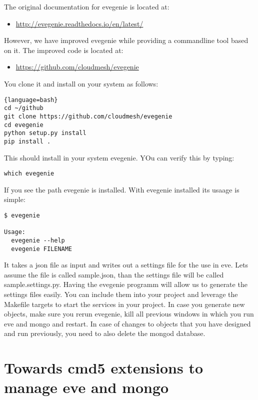 The original documentation for evegenie is located at:

\begin{itemize}
\item
 \url{http://evegenie.readthedocs.io/en/latest/}
\end{itemize}

However, we have improved evegenie while providing a commandline tool
based on it. The improved code is located at:

\begin{itemize}
\tightlist
\item
 \url{https://github.com/cloudmesh/evegenie}
\end{itemize}

You clone it and install on your system as follows:

\begin{lstlisting}{language=bash}
cd ~/github
git clone https://github.com/cloudmesh/evegenie
cd evegenie
python setup.py install
pip install .
\end{lstlisting}

This should install in your system evegenie. YOu can verify this by
typing:

\begin{lstlisting}
which evegenie
\end{lstlisting}

If you see the path evegenie is installed. With evegenie installed its
usaage is simple:

\begin{lstlisting}
$ evegenie

Usage:
  evegenie --help
  evegenie FILENAME
\end{lstlisting}

It takes a json file as input and writes out a settings file for the use
in eve. Lets assume the file is called sample.json, than the settings
file will be called sample.settings.py. Having the evegenie programm
will allow us to generate the settings files easily. You can include
them into your project and leverage the Makefile targets to start the
services in your project. In case you generate new objects, make sure
you rerun evegenie, kill all previous windows in which you run eve and
mongo and restart. In case of changes to objects that you have designed
and run previously, you need to also delete the mongod database.

\section{Towards cmd5 extensions to manage eve and
mongo}\label{towards-cmd5-extensions-to-manage-eve-and-mongo}

